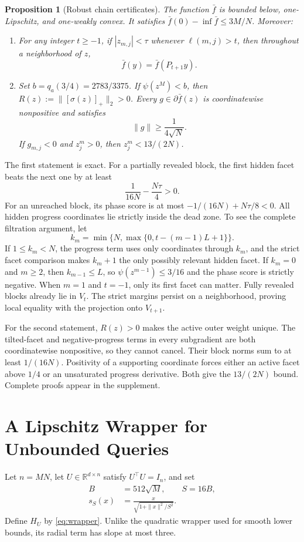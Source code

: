 \documentclass[twoside]{article}
\newtheorem{proposition}[theorem]{Proposition}
\newcommand{\R}{\mathbb R}
\begin{document}
\begin{proposition}[Robust chain certificates]
\label{prop:base}
The function $\bar f$ is bounded below, one-Lipschitz, and one-weakly convex. It satisfies $\bar f(0)-\inf\bar f\leq3M/N$. Moreover:
\begin{enumerate}
\item For any integer $t\geq-1$, if $|z_{m,j}|<\tau$ whenever
$\ell(m,j)>t$, then throughout a neighborhood of $z$, \[ \bar f(y)=\bar f(P_{t+1}y). \]
\item Set $b=q_a(3/4)=2783/3375$. If $\psi(z^M)<b$, then
$R(z):=\|[\sigma(z)]_+\|_2>0$. Every $g\in\partial\bar f(z)$ is coordinatewise nonpositive and satisfies \[ \|g\|\geq\frac1{4\sqrt N}. \] If $g_{m,j}<0$ and $z^m_j>0$, then $z^m_j<13/(2N)$.
\end{enumerate}
\end{proposition}

The first statement is exact. For a partially revealed block, the first hidden facet beats the next one by at least \[ \frac1{16N}-\frac{N\tau}{4}>0. \] For an unreached block, its phase score is at most $-1/(16N)+N\tau/8<0$. All hidden progress coordinates lie strictly inside the dead zone. To see the complete filtration argument, let \[ k_m=\min\{N,\max\{0,t-(m-1)L+1\}\}. \] If $1\leq k_m<N$, the progress term uses only coordinates through $k_m$, and the strict facet comparison makes $k_m+1$ the only possibly relevant hidden facet. If $k_m=0$ and $m\geq2$, then $k_{m-1}\leq L$, so $\psi(z^{m-1})\leq3/16$ and the phase score is strictly negative. When $m=1$ and $t=-1$, only its first facet can matter. Fully revealed blocks already lie in $V_t$. The strict margins persist on a neighborhood, proving local equality with the projection onto $V_{t+1}$.

For the second statement, $R(z)>0$ makes the active outer weight unique. The tilted-facet and negative-progress terms in every subgradient are both coordinatewise nonpositive, so they cannot cancel. Their block norms sum to at least $1/(16N)$. Positivity of a supporting coordinate forces either an active facet above $1/4$ or an unsaturated progress derivative. Both give the $13/(2N)$ bound. Complete proofs appear in the supplement.

\section{A Lipschitz Wrapper for Unbounded Queries}
\label{sec:wrapper}

Let $n=MN$, let $U\in\R^{d\times n}$ satisfy $U^\top U=I_n$, and set
\begin{align*}
 B&=512\sqrt M,\qquad S=16B,\\
 s_S(x)&=\frac{x}{\sqrt{1+\|x\|^2/S^2}}.
\end{align*}
Define $H_U$ by \eqref{eq:wrapper}. Unlike the quadratic wrapper used for smooth lower bounds, its radial term has slope at most three.
\end{document}
